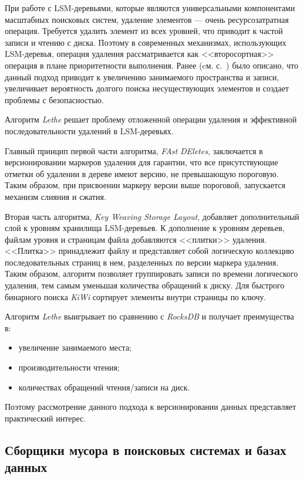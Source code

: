 При работе с LSM-деревьями, которые являются универсальными компонентами масштабных
поисковых систем, удаление элементов — очень ресурсозатратная операция. Требуется
удалить элемент из всех уровней, что приводит к частой записи и чтению с диска.
Поэтому в современных механизмах, использующих LSM-деревья, операция удаления
рассматривается как <<второсортная>> операция в плане приоритетности выполнения.
Ранее (cм. с.~\pageref{amplification}) было описано, что данный подход приводит к
увеличению занимаемого пространства и записи, увеличивает вероятность долгого поиска
несуществующих элементов и создает проблемы с безопасностью.

Алгоритм \textit{Lethe} \cite{Lethe:2020} решает проблему отложенной операции удаления и
эффективной последовательности удалений в LSM-деревьях. 

Главный принцип первой части алгоритма, \textit{FAst DEletes}, заключается в версионировании
маркеров удаления для гарантии, что все присутствующие отметки об удалении в
дереве имеют версию, не превышающую пороговую. Таким образом, при присвоении
маркеру версии выше пороговой, запускается механизм слияния и сжатия.

Вторая часть алгоритма, \textit{Key Weaving Storage Layout}, добавляет дополнительный
слой к уровням хранилища LSM-деревьев. К дополнение к уровням деревьев, файлам
уровня и страницам файла добавляются <<плитки>> удаления. <<Плитка>> принадлежит
файлу и представляет собой логическую коллекцию последовательных страниц в нем,
разделенных по версии маркера удаления. Таким образом, алгоритм позволяет
группировать записи по времени логического удаления, тем самым уменьшая количества
обращений к диску. Для быстрого бинарного поиска \textit{KiWi} сортирует элементы
внутри страницы по ключу.

Алгоритм \textit{Lethe} выигрывает по сравнению с \textit{RocksDB} и получает преимущества в:
\begin{itemize}
    \item увеличение занимаемого места;
    \item производительности чтения;
    \item количествах обращений чтения/записи на диск.
\end{itemize}

Поэтому рассмотрение данного подхода к версионировании данных представляет
практический интерес.

\subsection{Сборщики мусора в поисковых системах и базах данных}

